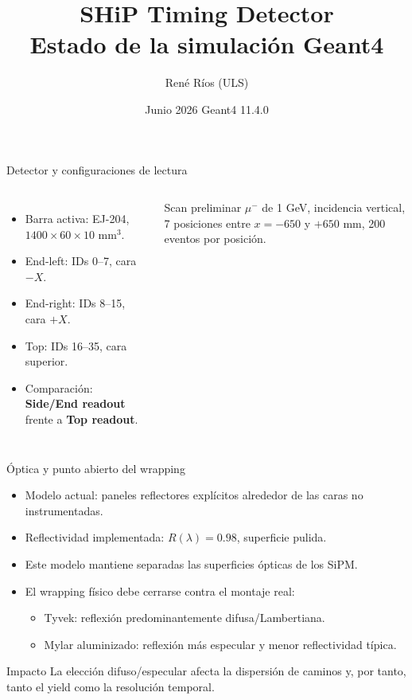 \documentclass[aspectratio=169]{beamer}
\title{SHiP Timing Detector\\Estado de la simulación Geant4}
\author{René Ríos (ULS)}
\institute{Revisión de supervisor / SHiP Collaboration Meeting}
\date{Junio 2026 \quad Geant4 11.4.0}
\begin{document}
\begin{frame}
  \titlepage
\end{frame}

\begin{frame}{Detector y configuraciones de lectura}
  \begin{columns}[T]
    \begin{itemize}
      \item Barra activa: EJ-204, $1400\times60\times10$ mm$^3$.
      \item End-left: IDs 0--7, cara $-X$.
      \item End-right: IDs 8--15, cara $+X$.
      \item Top: IDs 16--35, cara superior.
      \item Comparación: \textbf{Side/End readout} frente a \textbf{Top readout}.
    \end{itemize}
    \begin{block}{Scan preliminar}
      $\mu^-$ de 1 GeV, incidencia vertical, 7 posiciones entre
      $x=-650$ y $+650$ mm, 200 eventos por posición.
    \end{block}
  \end{columns}
\end{frame}

\begin{frame}{Óptica y punto abierto del wrapping}
  \begin{itemize}
    \item Modelo actual: paneles reflectores explícitos alrededor de las caras no instrumentadas.
    \item Reflectividad implementada: $R(\lambda)=0.98$, superficie pulida.
    \item Este modelo mantiene separadas las superficies ópticas de los SiPM.
    \item El wrapping físico debe cerrarse contra el montaje real:
      \begin{itemize}
        \item Tyvek: reflexión predominantemente difusa/Lambertiana.
        \item Mylar aluminizado: reflexión más especular y menor reflectividad típica.
      \end{itemize}
  \end{itemize}
  \begin{alertblock}{Impacto}
    La elección difuso/especular afecta la dispersión de caminos y, por tanto,
    tanto el yield como la resolución temporal.
  \end{alertblock}
\end{frame}
\end{document}
